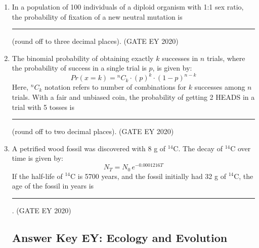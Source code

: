 \begin{enumerate}
\begin{multicols}{2}
\begin{enumerate}
\item P-iv, Q-v, R-i, S-ii
\item P-ii, Q-iv, R-iii, S-i
\item P-i, Q-ii, R-iii, S-iv
\item P-iii, Q-v, R-i, S-ii
\end{enumerate}
\end{multicols}

\item
In a population of 100 individuals of a diploid organism with 1:1 sex ratio, the probability of fixation of a new neutral mutation is \rule{2cm}{0.15mm} (round off to three decimal places). \hfill {(GATE EY 2020)}

\item
The binomial probability of obtaining exactly $k$ successes in $n$ trials, where the probability of success in a single trial is $p$, is given by:\\
\[
Pr(x=k) =  {}^nC_k{} \cdot (p)^k \cdot (1-p)^{n-k}
\]
Here, $^nC_k$ notation refers to number of combinations for $k$ successes among $n$ trials. With a fair and unbiased coin, the probability of getting 2 HEADS in a trial with 5 tosses is \rule{2cm}{0.15mm} (round off to two decimal places). \hfill {(GATE EY 2020)}

\item
A petrified wood fossil was discovered with 8 g of $^{14}$C. The decay of $^{14}$C over time is given by:\\
\[
N_T = N_0 \, e^{-0.0001216T}
\]
If the half-life of $^{14}$C is 5700 years, and the fossil initially had 32 g of $^{14}$C, the age of the fossil in years is \rule{2cm}{0.15mm}. \hfill {(GATE EY 2020)}
\newpage
\subsection{Answer Key EY: Ecology and Evolution}

\end{enumerate}




